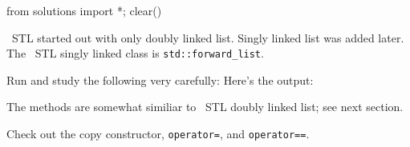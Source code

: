 \begin{python0}
from solutions import *; clear()
\end{python0}

\cpp\ STL started out with only doubly linked list.
Singly linked list was added later.
The \cpp\ STL singly linked class is \verb!std::forward_list!.

Run and study the following very carefully:
Here's the output:


The methods are somewhat similiar to \cpp\
STL doubly linked list; see next
section.

\begin{ex}
  Check out the copy constructor, \verb!operator=!, and \verb!operator==!.
\end{ex}

